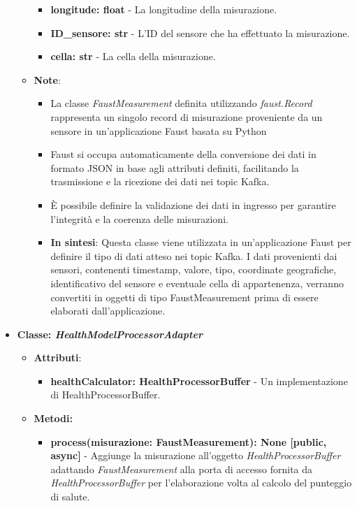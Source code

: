 \begin{itemize}
\begin{itemize}
\begin{itemize}
        \item \textbf{longitude: float} - La longitudine della misurazione.
        \item \textbf{ID\_sensore: str} - L'ID del sensore che ha effettuato la misurazione.
        \item \textbf{cella: str} - La cella della misurazione.
    \end{itemize}
    \item\textbf{Note}:
        \begin{itemize}
            \item La classe \textit{FaustMeasurement} definita utilizzando \textit{faust.Record} rappresenta un singolo record di misurazione proveniente da un sensore in un'applicazione Faust basata su Python
            \item Faust si occupa automaticamente della conversione dei dati in formato JSON in base agli attributi definiti, facilitando la trasmissione e la ricezione dei dati nei topic Kafka.
            \item È possibile definire la validazione dei dati in ingresso per garantire l'integrità e la coerenza delle misurazioni.
            \item \textbf{In sintesi}:
            Questa classe viene utilizzata in un'applicazione Faust per definire il tipo di dati atteso nei topic Kafka. I dati provenienti dai sensori, contenenti timestamp, valore, tipo, coordinate geografiche, identificativo del sensore e eventuale cella di appartenenza, verranno convertiti in oggetti di tipo FaustMeasurement prima di essere elaborati dall'applicazione.
        \end{itemize}
    \end{itemize}
    \item{\textbf{Classe: \textit{HealthModelProcessorAdapter}}}
    \begin{itemize}
    \item\textbf{Attributi}:
        \begin{itemize}
        \item \textbf{healthCalculator: HealthProcessorBuffer} - Un implementazione di HealthProcessorBuffer.
    \end{itemize}
    \item \textbf{Metodi: }
    \begin{itemize}
        \item \textbf{process(misurazione: FaustMeasurement): None [public, async]} - Aggiunge la misurazione all'oggetto \textit{HealthProcessorBuffer} adattando \textit{FaustMeasurement} alla porta di accesso fornita da \textit{HealthProcessorBuffer} per l'elaborazione volta al calcolo del punteggio di salute.

\end{itemize}
\end{itemize}
\end{itemize}
